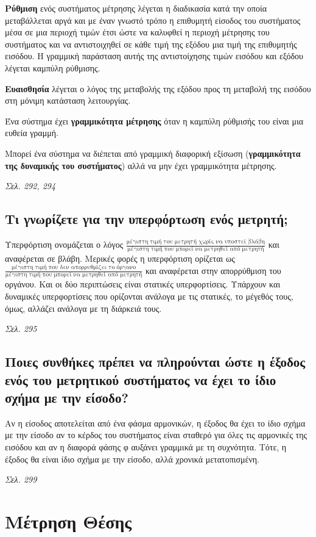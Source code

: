 \documentclass{article}
\begin{document}
\textbf{Ρύθμιση} ενός συστήματος μέτρησης λέγεται η διαδικασία κατά την οποία μεταβάλλεται αργά και με έναν γνωστό τρόπο η επιθυμητή είσοδος του συστήματος μέσα σε μια
περιοχή τιμών έτσι ώστε να καλυφθεί η περιοχή μέτρησης του συστήματος και να αντιστοιχηθεί σε κάθε τιμή της εξόδου μια τιμή της επιθυμητής εισόδου. Η γραμμική παράσταση
αυτής της αντιστοίχησης τιμών εισόδου και εξόδου λέγεται καμπύλη ρύθμισης.

\textbf{Ευαισθησία} λέγεται ο λόγος της μεταβολής της εξόδου προς τη μεταβολή της εισόδου στη μόνιμη κατάσταση λειτουργίας.

Ένα σύστημα έχει \textbf{γραμμικότητα μέτρησης} όταν η καμπύλη ρύθμισής του είναι μια ευθεία γραμμή.

Μπορεί ένα σύστημα να διέπεται από γραμμική διαφορική εξίσωση (\textbf{γραμμικότητα της δυναμικής του συστήματος}) αλλά να μην έχει γραμμικότητα μέτρησης.

\emph{Σελ. 292, 294}
\subsection{Τι γνωρίζετε για την υπερφόρτωση ενός μετρητή;}
Υπερφόρτιση ονομάζεται ο λόγος $\frac{\text{μέγιστη τιμή του μετρητή χωρίς να υποστεί βλάβη}}{\text{μέγιστη τιμή που μπορεί να μετρηθεί από μετρητή}}$ και αναφέρεται σε βλάβη. 
Μερικές φορές η υπερφόρτιση ορίζεται ως $\frac{\text{μέγιστη τιμή που δεν απορρυθμίζει το όργανο}}{\text{μέγιστη τιμή που μπορεί να μετρηθεί από μετρητή}}$ και αναφέρεται 
στην απορρύθμιση του οργάνου. Και οι δύο περιπτώσεις είναι στατικές υπερφορτίσεις. Υπάρχουν και δυναμικές υπερφορτίσεις που ορίζονται ανάλογα με τις στατικές, το μέγεθός
τους, όμως, αλλάζει ανάλογα με τη διάρκειά τους.


\emph{Σελ. 295}
\subsection{Ποιες συνθήκες πρέπει να πληρούνται ώστε η έξοδος ενός του μετρητικού συστήματος να έχει το ίδιο σχήμα με την είσοδο?}
Αν η είσοδος αποτελείται από ένα φάσμα αρμονικών, η έξοδος θα έχει το ίδιο σχήμα με την είσοδο αν το κέρδος του συστήματος είναι σταθερό για
όλες τις αρμονικές της εισόδου και αν η διαφορά φάσης φ αυξάνει γραμμικά με τη συχνότητα. Τότε, η έξοδος θα είναι ίδιο σχήμα με την είσοδο,
αλλά χρονικά μετατοπισμένη. 

\emph{Σελ. 299}

\section{Μέτρηση Θέσης}
\end{document}
